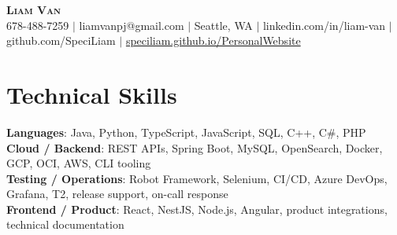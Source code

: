 \documentclass[letterpaper,11pt]{article}
\begin{document}

%
\begin{center}
    \textbf{\Huge \scshape Liam Van} \\ \vspace{1pt}
    \small 678-488-7259 $|$ \small {liamvanpj@gmail.com} $|$ Seattle, WA
 {{$|$ linkedin.com/in/liam-van} {$|$ github.com/SpeciLiam} {$|$ \href{https://speciliam.github.io/PersonalWebsite}{speciliam.github.io/PersonalWebsite}}}

\end{center}

\section{Technical Skills}
 \begin{itemize}[leftmargin=0.15in, label={}]
    \small{\item{
     \textbf{Languages}{: Java, Python, TypeScript, JavaScript, SQL, C++, C\#, PHP} \\
     \textbf{Cloud / Backend}{: REST APIs, Spring Boot, MySQL, OpenSearch, Docker, GCP, OCI, AWS, CLI tooling} \\
     \textbf{Testing / Operations}{: Robot Framework, Selenium, CI/CD, Azure DevOps, Grafana, T2, release support, on-call response} \\
     \textbf{Frontend / Product}{: React, NestJS, Node.js, Angular, product integrations, technical documentation} \\
    }}
 \end{itemize}
%
\end{document}
